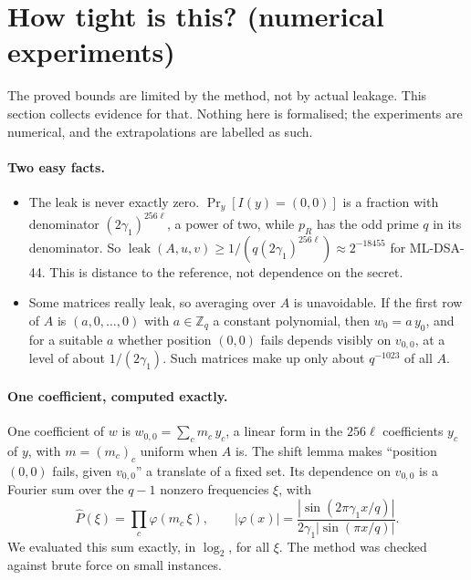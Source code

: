\documentclass[11pt]{article}
\theoremstyle{definition}
\theoremstyle{remark}
\newcommand{\Zq}{\mathbb{Z}_q}
\newcommand{\leak}{\operatorname{leak}}
\renewcommand{\Pr}{\mathop{\mathrm{Pr}}}
\begin{document}
\section{How tight is this? (numerical experiments)}\label{sec:tight}

The proved bounds are limited by the method, not by actual leakage. This section collects
evidence for that. Nothing here is formalised; the experiments are numerical, and the
extrapolations are labelled as such.

\paragraph{Two easy facts.}
\begin{itemize}
  \item The leak is never exactly zero. $\Pr_y[I(y)=(0,0)]$ is a fraction with denominator
        $(2\gamma_1)^{256\ell}$, a power of two, while $p_R$ has the odd prime $q$ in its
        denominator. So $\leak(A,u,v)\ge 1/(q(2\gamma_1)^{256\ell})\approx2^{-18455}$ for
        ML-DSA-44. This is distance to
        the reference, not dependence on the secret.
  \item Some matrices really leak, so averaging over $A$ is unavoidable. If the first row of $A$
        is $(a, 0, \dots, 0)$ with $a \in \Zq$ a constant polynomial, then $w_0 = a\,y_0$, and for
        a suitable $a$ whether position $(0,0)$ fails depends visibly on $v_{0,0}$, at a level of about
        $1/(2\gamma_1)$. Such matrices make up only about $q^{-1023}$ of all $A$.
\end{itemize}

\paragraph{One coefficient, computed exactly.}
One coefficient of $w$ is $w_{0,0}=\sum_{c} m_c\,y_c$, a linear form in the $256\ell$ coefficients
$y_c$ of $y$, with $m = (m_c)_c$ uniform when $A$ is. The shift lemma makes ``position $(0,0)$
fails, given $v_{0,0}$'' a translate of a fixed set. Its dependence on $v_{0,0}$ is a Fourier sum
over the $q-1$ nonzero frequencies $\xi$, with
\[
  \hat P(\xi)=\prod_{c}\varphi(m_c\,\xi),\qquad
  |\varphi(x)|=\frac{|\sin(2\pi\gamma_1x/q)|}{2\gamma_1|\sin(\pi x/q)|}.
\]
We evaluated this sum exactly, in $\log_2$, for all $\xi$. The method was checked against brute
force on small instances.
\end{document}
